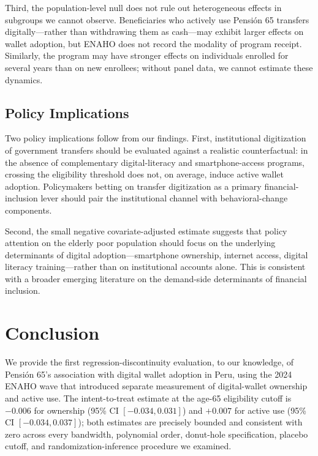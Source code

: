 \documentclass[12pt]{article}
\begin{document}
Third, the population-level null does not rule out heterogeneous effects in subgroups we cannot observe. Beneficiaries who actively use Pensi\'on 65 transfers digitally---rather than withdrawing them as cash---may exhibit larger effects on wallet adoption, but ENAHO does not record the modality of program receipt. Similarly, the program may have stronger effects on individuals enrolled for several years than on new enrollees; without panel data, we cannot estimate these dynamics.

\subsection{Policy Implications}

Two policy implications follow from our findings. First, institutional digitization of government transfers should be evaluated against a realistic counterfactual: in the absence of complementary digital-literacy and smartphone-access programs, crossing the eligibility threshold does not, on average, induce active wallet adoption. Policymakers betting on transfer digitization as a primary financial-inclusion lever should pair the institutional channel with behavioral-change components.

Second, the small negative covariate-adjusted estimate suggests that policy attention on the elderly poor population should focus on the underlying determinants of digital adoption---smartphone ownership, internet access, digital literacy training---rather than on institutional accounts alone. This is consistent with a broader emerging literature on the demand-side determinants of financial inclusion.


\section{Conclusion}
\label{sec:conclusion}

We provide the first regression-discontinuity evaluation, to our knowledge, of Pensi\'on 65's association with digital wallet adoption in Peru, using the 2024 ENAHO wave that introduced separate measurement of digital-wallet ownership and active use. The intent-to-treat estimate at the age-65 eligibility cutoff is $-0.006$ for ownership (95\% CI $[-0.034, 0.031]$) and $+0.007$ for active use (95\% CI $[-0.034, 0.037]$); both estimates are precisely bounded and consistent with zero across every bandwidth, polynomial order, donut-hole specification, placebo cutoff, and randomization-inference procedure we examined.
\end{document}
